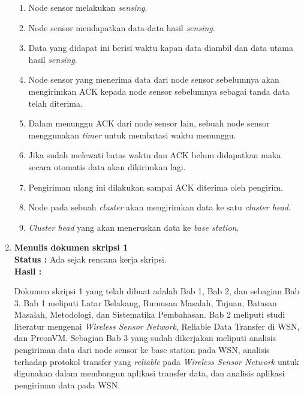 \documentclass[a4paper,twoside]{article}
\begin{document}
\begin{enumerate}
\begin{enumerate}
	\item Node sensor melakukan \textit{sensing}.
	\item Node sensor mendapatkan data-data hasil \textit{sensing}.
	\item Data yang didapat ini berisi waktu kapan data diambil dan data utama hasil \textit{sensing}.
	\item Node sensor yang menerima data dari node sensor sebelumnya akan mengirimkan ACK kepada node sensor sebelumnya sebagai tanda data telah diterima.
	\item Dalam menunggu ACK dari node sensor lain, sebuah node sensor menggunakan \textit{timer} untuk membatasi waktu menunggu.
	\item Jika sudah melewati batas waktu dan ACK belum didapatkan maka secara otomatis data akan dikirimkan lagi.
	\item Pengiriman ulang ini dilakukan sampai ACK diterima oleh pengirim.
	\item Node pada sebuah \textit{cluster} akan mengirimkan data ke satu \textit{cluster head}.
	\item \textit{Cluster head} yang akan meneruskan data ke \textit{base station}.
\end{enumerate}

		\item \textbf{Menulis dokumen skripsi 1}\\
		{\bf Status :} Ada sejak rencana kerja skripsi.\\
		{\bf Hasil :} 
		
		Dokumen skripsi 1 yang telah dibuat adalah Bab 1, Bab 2, dan sebagian Bab 3. Bab 1 meliputi Latar Belakang, Rumusan Masalah, Tujuan, Batasan Masalah, Metodologi, dan Sistematika Pembahasan. Bab 2 meliputi studi literatur mengenai \textit{Wireless Sensor Network}, Reliable Data Transfer di WSN, dan PreonVM. Sebagian Bab 3 yang sudah dikerjakan meliputi analisis pengiriman data dari node sensor ke base station pada WSN, analisis terhadap protokol transfer yang \textit{reliable} pada \textit{Wireless Sensor Network} untuk digunakan dalam membangun aplikasi transfer data, dan analisis aplikasi pengiriman data pada WSN.

	\end{enumerate}
\end{document}
